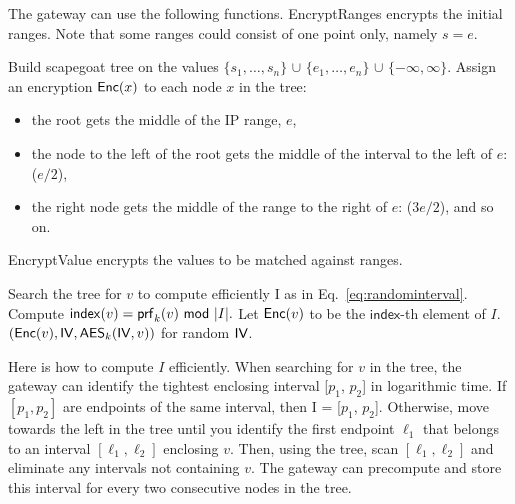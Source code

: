 The gateway can use the following functions. EncryptRanges encrypts the initial ranges. Note that some ranges could consist of
one point only, namely $s = e$. 


\begin{framed}
\begin{algorithmic}[1]

  \State Build scapegoat tree on the values 
              $\{s_1, \dots, s_n\}$ 
              $\cup$ $\{e_1, \dots, e_n\}$ 
              $\cup$ $\{-\infty, \infty\}$.
  \State Assign an encryption $\mathsf{Enc}(x)$ to each node $x$ in the tree:
  \begin{itemize}
  \item the root gets the middle of the IP range, $e$, 
  \item the node to the left of the root gets the middle of the interval to the left of $e$: ($e/2$),
  \item the right node gets the middle of the range
  to the right of $e$: ($3e/2$), and so on.
  \end{itemize}

  \State {}
\EndProcedure

\end{algorithmic}
\end{framed}



EncryptValue encrypts the values to be matched against ranges.

\begin{framed}
\begin{algorithmic}[1]

  \State Search the tree for $v$ to compute efficiently I as in Eq.~\ref{eq:randominterval}.
  \State Compute $\mathsf{index}(v) = \prf_k(v)\ \mod\ |I|.$ 
  \State Let $\mathsf{Enc}(v)$ to be the $\mathsf{index}$-th element of $I$. 
  \State \Return $\left(\mathsf{Enc}(v), \mathsf{IV}, \mathsf{AES}_k(\mathsf{IV}, v)\right)$ for random $\mathsf{IV}$. 
\EndProcedure

\end{algorithmic}
\end{framed}

Here is how to compute $I$ efficiently. When searching for $v$ in the tree, the gateway
can identify the tightest enclosing interval [$p_1$, $p_2$] in logarithmic time. 
 If $[p_1, p_2]$ are endpoints of the
same interval, then I = [$p_1$, $p_2$]. Otherwise, move towards the left in the tree until you identify the first endpoint
$\ell_1$
that belongs to an interval $[\ell_1, \ell_2]$ enclosing $v$. Then, using the tree, scan $[\ell_1, \ell_2]$ and eliminate
any intervals not containing $v$. The gateway can precompute and store this interval for every two consecutive nodes in the tree.

